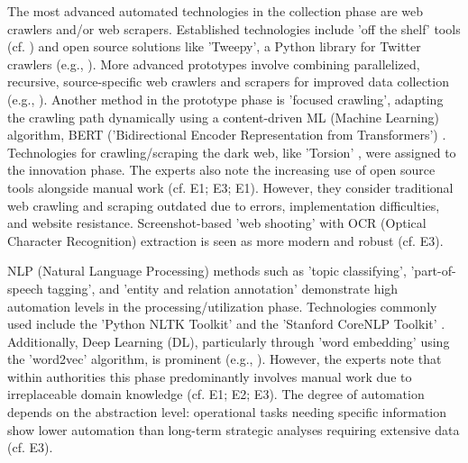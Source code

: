 \documentclass[10pt]{article}
\begin{document}
The most advanced automated technologies in the collection phase are web crawlers and/or web scrapers.
Established technologies include 'off the shelf' tools (cf. \cite{Middleton.2020}) and open source
solutions like 'Tweepy', a Python library for Twitter crawlers (e.g., \cite{Adewopo.2020}).
More advanced prototypes involve combining parallelized, recursive, source-specific web crawlers and scrapers for improved
data collection (e.g., \cite{Jenkins.2021}). Another method in the prototype phase is
'focused crawling', adapting the crawling path dynamically using a content-driven ML (Machine Learning) algorithm, BERT ('Bidirectional Encoder Representation from Transformers')
\cite{Kuehn.2023}. Technologies for crawling/scraping the dark web, like 'Torsion' \cite{Sonawane.2022},
were assigned to the innovation phase. The experts also note the increasing use of open source tools alongside manual work
(cf. E1; E3; E1). However, they consider traditional web crawling and scraping
outdated due to errors, implementation difficulties, and website resistance. Screenshot-based 'web shooting' with
OCR (Optical Character Recognition) extraction is seen as more modern and robust (cf. E3).

NLP (Natural Language Processing) methods such as 'topic classifying', 'part-of-speech tagging', and 'entity and relation annotation'
demonstrate high automation levels in the processing/utilization phase. Technologies commonly used include
the 'Python NLTK Toolkit' \cite{Hubbard.2022} and the 'Stanford CoreNLP Toolkit' \cite{Middleton.2020}.
Additionally, Deep Learning (DL), particularly through 'word embedding' using the 'word2vec' algorithm, is prominent
(e.g., \cite{Bai.2020}). However, the experts note that within authorities this phase predominantly involves manual work due to irreplaceable domain knowledge
(cf. E1; E2; E3). The degree of automation depends on the abstraction level:
operational tasks needing specific information show lower automation than long-term strategic analyses requiring
extensive data (cf. E3).
\end{document}

